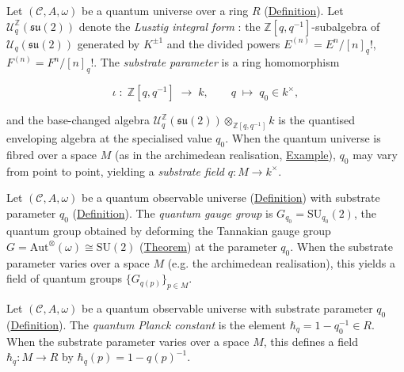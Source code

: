 \begin{definition}
  \label{def:substrate-parameter}
Let $(\mathcal{C}, A, \omega)$ be a quantum universe over a ring $R$
(\hyperref[def:quantum-universe]{Definition}).  Let
$\mathcal{U}^{\mathbb{Z}}_q(\mathfrak{su}(2))$ denote the
\emph{Lusztig integral form} \cite{lusztig1993}: the
$\mathbb{Z}[q,q^{-1}]$-subalgebra of $\mathcal{U}_q(\mathfrak{su}(2))$
generated by $K^{\pm 1}$ and the divided powers
$E^{(n)} = E^n/[n]_q!$, $F^{(n)} = F^n/[n]_q!$.
The \emph{substrate parameter} is a ring homomorphism

\[
\iota \;\colon\; \mathbb{Z}[q, q^{-1}] \;\longrightarrow\; k,
  \qquad q \;\longmapsto\; q_0 \in k^{\times},
\]

and the base-changed algebra
$\mathcal{U}^{\mathbb{Z}}_q(\mathfrak{su}(2))
  \otimes_{\mathbb{Z}[q,q^{-1}]} k$
is the quantised enveloping algebra at the specialised value $q_0$.
When the quantum universe is fibred over a space $M$ (as in the
archimedean realisation, \hyperref[def:c-quantum-universe]{Example}), $q_0$
may vary from point to point, yielding a \emph{substrate field}
$q \colon M \to k^{\times}$.
\end{definition}

\begin{definition}
  \label{def:quantum-gauge-group}
Let $(\mathcal{C}, A, \omega)$ be a quantum observable universe
(\hyperref[def:quantum-observable-universe]{Definition}) with substrate
parameter $q_0$ (\hyperref[def:substrate-parameter]{Definition}).  The
\emph{quantum gauge group} is
$G_{q_0} = \mathrm{SU}_{q_0}(2)$, the quantum group obtained by
deforming the Tannakian gauge group
$G = \mathrm{Aut}^{\otimes}(\omega) \cong \mathrm{SU}(2)$
(\hyperref[thm:su2-emergence]{Theorem}) at the parameter $q_0$.  When the
substrate parameter varies over a space $M$ (e.g. the archimedean
realisation), this yields a field of quantum groups
$\{G_{q(p)}\}_{p \in M}$.
\end{definition}

\begin{definition}
  \label{def:quantum-planck-constant}
Let $(\mathcal{C}, A, \omega)$ be a quantum observable universe with
substrate parameter $q_0$
(\hyperref[def:substrate-parameter]{Definition}).  The
\emph{quantum Planck constant} is the element
$\hbar_q = 1 - q_0^{-1} \in R$.  When the substrate parameter varies
over a space $M$, this defines a field
$\hbar_q \colon M \to R$ by $\hbar_q(p) = 1 - q(p)^{-1}$.
\end{definition}

